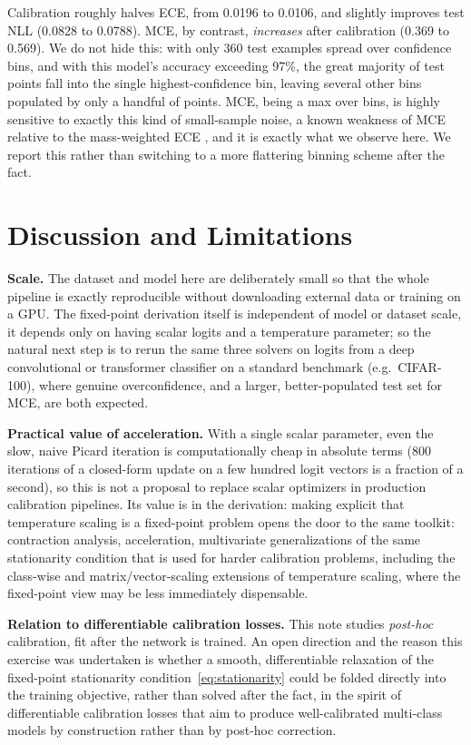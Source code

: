 \documentclass[11pt]{article}
\begin{document}
Calibration roughly halves ECE, from 0.0196 to 0.0106, and slightly
improves test NLL (0.0828 to 0.0788). MCE, by contrast,
\emph{increases} after calibration (0.369 to 0.569). We do not hide
this: with only 360 test examples spread over confidence bins, and
with this model's accuracy exceeding 97\%, the great majority of test
points fall into the single highest-confidence bin, leaving several
other bins populated by only a handful of points. MCE, being a max
over bins, is highly sensitive to exactly this kind of small-sample
noise, a known weakness of MCE relative to the mass-weighted ECE
\citep{naeini2015obtaining}, and it is exactly what we observe here.
We report this rather than switching to a more flattering binning
scheme after the fact.

\section{Discussion and Limitations}

\textbf{Scale.} The dataset and model here are deliberately small so
that the whole pipeline is exactly reproducible without downloading
external data or training on a GPU. The fixed-point derivation itself
is independent of model or dataset scale, it depends only on having
scalar logits and a temperature parameter; so the natural next step
is to rerun the same three solvers on logits from a deep convolutional
or transformer classifier on a standard benchmark (e.g.\ CIFAR-100),
where genuine overconfidence, and a larger, better-populated test set
for MCE, are both expected.

\textbf{Practical value of acceleration.} With a single scalar
parameter, even the slow, naive Picard iteration is computationally
cheap in absolute terms (800 iterations of a closed-form update on a
few hundred logit vectors is a fraction of a second), so this is not a
proposal to replace scalar optimizers in production calibration
pipelines. Its value is in the derivation: making explicit that
temperature scaling is a fixed-point problem opens the door to the
same toolkit: contraction analysis, acceleration, multivariate
generalizations of the same stationarity condition that is used for
harder calibration problems, including the class-wise and
matrix/vector-scaling extensions of temperature scaling, where the
fixed-point view may be less immediately dispensable.

\textbf{Relation to differentiable calibration losses.} This note
studies \emph{post-hoc} calibration, fit after the network is trained.
An open direction and the reason this exercise was undertaken is
whether a smooth, differentiable relaxation of the fixed-point
stationarity condition~\eqref{eq:stationarity} could be folded
directly into the training objective, rather than solved after the
fact, in the spirit of differentiable calibration losses that aim to
produce well-calibrated multi-class models by construction rather than
by post-hoc correction.
\end{document}
